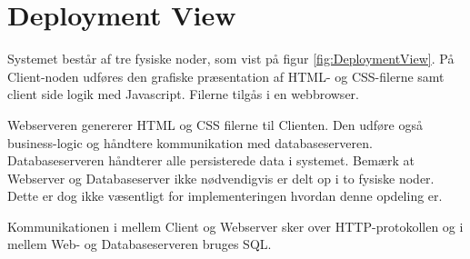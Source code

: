 \section{Deployment View}
Systemet består af tre fysiske noder, som vist på figur \ref{fig:DeploymentView}. På Client-noden udføres den grafiske præsentation af HTML- og CSS-filerne samt client side logik med Javascript. Filerne tilgås i en webbrowser.

Webserveren genererer HTML og CSS filerne til Clienten. Den udføre også business-logic og håndtere kommunikation med databaseserveren.
Databaseserveren håndterer alle persisterede data i systemet.
Bemærk at Webserver og Databaseserver ikke nødvendigvis er delt op i to fysiske noder. Dette er dog ikke væsentligt for implementeringen hvordan denne opdeling er.

Kommunikationen i mellem Client og Webserver sker over HTTP-protokollen og i mellem Web- og Databaseserveren bruges SQL.

